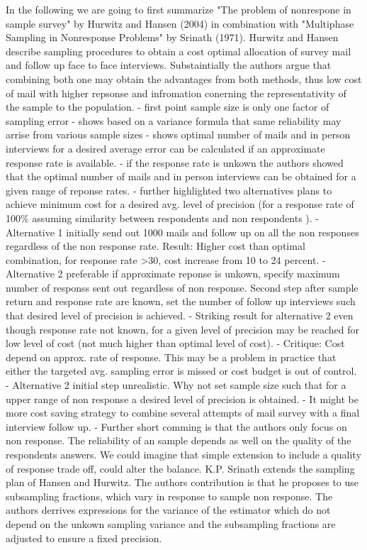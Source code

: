 In the following we are going to first summarize "The problem of nonrespone in sample survey" by Hurwitz and Hansen (2004) in combination with "Multiphase Sampling in Nonresponse Problems" by Srinath (1971). 
Hurwitz and Hansen describe sampling procedures to obtain a cost optimal allocation of survey mail and follow up face to face interviews. Substaintially the authors argue that combining both one may obtain the advantages from both methods, thus low cost of mail with higher repsonse and infromation conerning the representativity of the sample to the population. 
- first point sample size is only one factor of sampling error
- shows based on a variance formula that same reliability may arrise from various sample sizes
- shows optimal number of mails and in person interviews for a desired average error can be calculated if an approximate response rate is available.
- if the response rate is unkown the authors showed that the optimal number of mails and in person interviews can be obtained for a given range of reponse rates.
-  further highlighted two alternatives plans to achieve minimum cost for a desired avg. level of precision (for a response rate of 100\% assuming similarity between respondents and non respondents ).
- Alternative 1 initially send out 1000 mails and follow up on all the non responses regardless of the non response rate.
  Result: Higher cost than optimal combination, for response rate >30, cost increase from 10 to 24 percent.
- Alternative 2 preferable if approximate reponse is unkown, specify maximum number of responss sent out regardless of non response. Second step after sample return and response rate are known, set the number of follow up interviews such that desired level of precision is achieved.
- Striking result for alternative 2 even though response rate not known, for a given level of precision may be reached for low level of cost (not much higher than optimal level of cost). 
- Critique: Cost depend on approx. rate of response. This may be a problem in practice that either the targeted avg. sampling error is missed or cost budget is out of control. 
- Alternative 2 initial step unrealistic. Why not set sample size such that for a upper range of non response a desired level of precision is obtained. 
- It might be more cost saving strategy to combine several attempts of mail survey with a final interview follow up. 
- Further short comming is that the authors only focus on non response. The reliability of an sample depends as well on the quality of the respondents answers. We could imagine that simple extension to include a quality of response trade off, could alter the balance. 
K.P. Srinath extends the sampling plan of Hansen and Hurwitz. The authors contribution is that he proposes to use subsampling fractions, which vary in response to sample non response. The authors derrives expressions for the variance of the estimator which do not depend on the unkown sampling variance and the subsampling fractions are adjusted to ensure a fixed precision.  

\endinput
